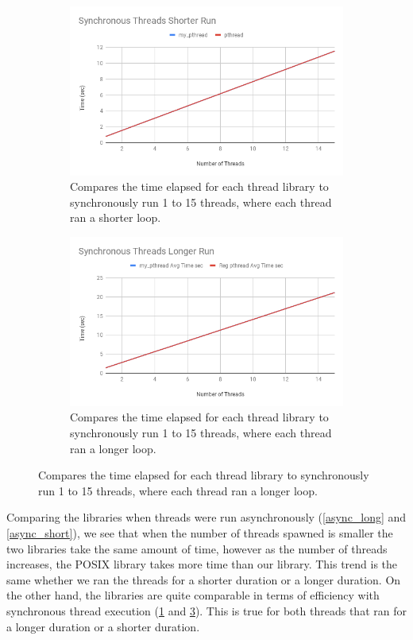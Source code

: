 \documentclass{article}
\begin{document}
\begin{figure}[!h]
        \begin{subfigure}[b]{.49\textwidth}
        \includegraphics[width=\textwidth]{Synchronous_Threads_Shorter_Run.png}
        \caption{Compares the time elapsed for each thread library to synchronously run 1 to 15 threads, where each thread ran a shorter loop.}
        \label{sync_short}
    \end{subfigure}
    \begin{subfigure}[b]{.49\textwidth}
        \includegraphics[width=\textwidth]{Synchronous_Threads_Longer_Run.png}
        \caption{Compares the time elapsed for each thread library to synchronously run 1 to 15 threads, where each thread ran a longer loop.}
        \label{sync_long}
    \end{subfigure}
\end{figure}

Comparing the libraries when threads were run asynchronously (\ref{async_long} and \ref{async_short}), we see that when the number of threads spawned is smaller the two libraries take the same amount of time, however as the number of threads increases, the POSIX library takes more time than our library. This trend is the same whether we ran the threads for a shorter duration or a longer duration. On the other hand, the libraries are quite comparable in terms of efficiency with synchronous thread execution (\ref{sync_short} and \ref{sync_long}). This is true for both threads that ran for a longer duration or a shorter duration.
\end{document}
